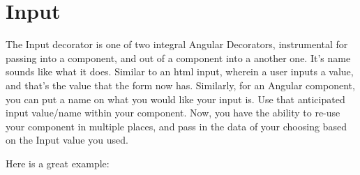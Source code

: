 \section{ Input }

The Input decorator is one of two integral Angular Decorators, instrumental
for passing into a component, and out of a component into a another one. It's
name sounds like what it does. Similar to an html input, wherein a user inputs
a value, and that's the value that the form now has. Similarly, for an Angular
component, you can put a name on what you would like your input is. Use that
anticipated input value/name within your component. Now, you have the ability to
re-use your component in multiple places, and pass in the data of your choosing
based on the Input value you used.

Here is a great example:

\begin{lstlisting}
\end{lstlisting}
